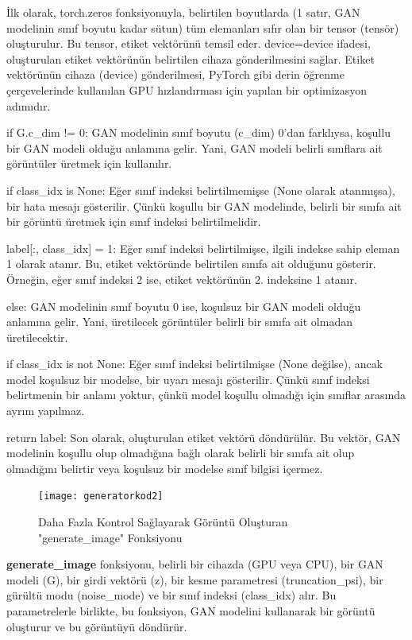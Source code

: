 \documentclass[12pt, a4paper]{article}
\begin{document}
	İlk olarak, torch.zeros fonksiyonuyla, belirtilen boyutlarda (1 satır, GAN modelinin sınıf boyutu kadar sütun) tüm elemanları sıfır olan bir tensor (tensör) oluşturulur. Bu tensor, etiket vektörünü temsil eder. device=device ifadesi, oluşturulan etiket vektörünün belirtilen cihaza gönderilmesini sağlar. Etiket vektörünün cihaza (device) gönderilmesi, PyTorch gibi derin öğrenme çerçevelerinde kullanılan GPU hızlandırması için yapılan bir optimizasyon adımıdır. 
	
	if G.c\_dim != 0: GAN modelinin sınıf boyutu (c\_dim) 0'dan farklıysa, koşullu bir GAN modeli olduğu anlamına gelir. Yani, GAN modeli belirli sınıflara ait görüntüler üretmek için kullanılır.
	
	if class\_idx is None: Eğer sınıf indeksi belirtilmemişse (None olarak atanmışsa), bir hata mesajı gösterilir. Çünkü koşullu bir GAN modelinde, belirli bir sınıfa ait bir görüntü üretmek için sınıf indeksi belirtilmelidir.
	
	label[:, class\_idx] = 1: Eğer sınıf indeksi belirtilmişse, ilgili indekse sahip eleman 1 olarak atanır. Bu, etiket vektöründe belirtilen sınıfa ait olduğunu gösterir. Örneğin, eğer sınıf indeksi 2 ise, etiket vektörünün 2. indeksine 1 atanır.
	
	else: GAN modelinin sınıf boyutu 0 ise, koşulsuz bir GAN modeli olduğu anlamına gelir. Yani, üretilecek görüntüler belirli bir sınıfa ait olmadan üretilecektir.
	
	if class\_idx is not None: Eğer sınıf indeksi belirtilmişse (None değilse), ancak model koşulsuz bir modelse, bir uyarı mesajı gösterilir. Çünkü sınıf indeksi belirtmenin bir anlamı yoktur, çünkü model koşullu olmadığı için sınıflar arasında ayrım yapılmaz.
	
	return label: Son olarak, oluşturulan etiket vektörü döndürülür. Bu vektör, GAN modelinin koşullu olup olmadığına bağlı olarak belirli bir sınıfa ait olup olmadığını belirtir veya koşulsuz bir modelse sınıf bilgisi içermez.
	
	\begin{figure}[h]
		\centering
		\texttt{[image: generatorkod2]}
		\label{generatorkod2}
		\caption{Daha Fazla Kontrol Sağlayarak Görüntü Oluşturan "generate\_image" Fonksiyonu}
	\end{figure}
	\FloatBarrier
	\textbf{generate\_image} fonksiyonu, belirli bir cihazda (GPU veya CPU), bir GAN modeli (G), bir girdi vektörü (z), bir kesme parametresi (truncation\_psi), bir gürültü modu (noise\_mode) ve bir sınıf indeksi (class\_idx) alır. Bu parametrelerle birlikte, bu fonksiyon, GAN modelini kullanarak bir görüntü oluşturur ve bu görüntüyü döndürür.
	
\end{document}

